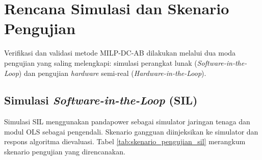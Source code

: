 \section{Rencana Simulasi dan Skenario Pengujian}
\label{sec:Rencana_Simulasi_dan_Skenario_Pengujian}

Verifikasi dan validasi metode MILP-DC-AB dilakukan melalui dua moda pengujian yang saling melengkapi: simulasi perangkat lunak (\textit{Software-in-the-Loop}) dan pengujian \textit{hardware} semi-real (\textit{Hardware-in-the-Loop}).

\subsection{Simulasi \textit{Software-in-the-Loop} (SIL)}
\label{subsec:Simulasi_SIL}

Simulasi SIL menggunakan pandapower sebagai simulator jaringan tenaga dan modul OLS sebagai pengendali. Skenario gangguan diinjeksikan ke simulator dan respons algoritma dievaluasi. Tabel \ref{tab:skenario_pengujian_sil} merangkum skenario pengujian yang direncanakan.

